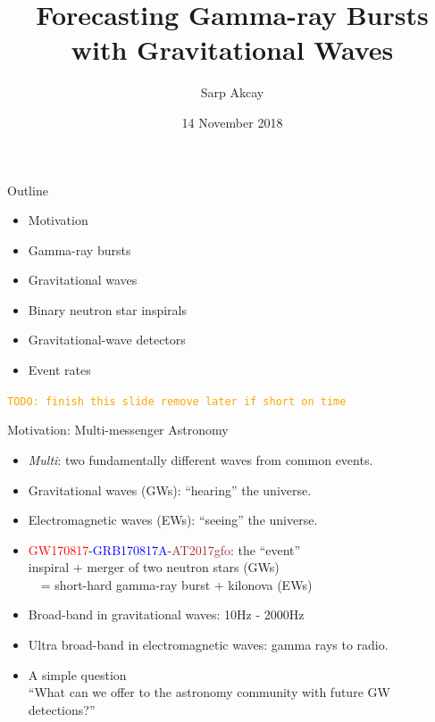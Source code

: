 \documentclass[xcolor=dvipsnames,handout,t]{beamer}
\title[] %
\title[Forecasting GRBs w/ GWs] %
{Forecasting Gamma-ray Bursts with Gravitational Waves}
\subtitle{\todo{Add background image}} %
\author[Sarp Akcay]{Sarp Akcay\inst{1}\inst{2} }
\institute[FSU Jena - UCD] %
{
  \inst{1}%
  FSU Jena %
  \inst{2}%
  University College Dublin
  }
\date[Sabanci University]{14 November 2018}
\newcommand{\todo}[1]{\textcolor{orange}{\texttt{TODO: #1}}}
\newcommand{\red}[1]{\textcolor{red}{#1}}
\newcommand{\bl}[1]{\textcolor{blue}{#1}}
\begin{document}
\begin{frame}
 \titlepage
\end{frame}

\begin{frame}{Outline}
\begin{itemize}
 \item Motivation
 \item Gamma-ray bursts
 \item Gravitational waves
 \item Binary neutron star inspirals
 \item Gravitational-wave detectors
 \item Event rates 
\end{itemize}
\todo{finish this slide remove later if short on time}

 
\end{frame}


\begin{frame}{Motivation: Multi-messenger Astronomy}
  \begin{itemize}
    \item \emph{Multi}: two fundamentally different waves from common events.
    \item[]\quad Gravitational waves (GWs): ``hearing''  the universe.
    \item[]\quad Electromagnetic waves (EWs): ``seeing'' the universe.
    \item \red{GW170817}-\bl{GRB170817A}-\textcolor{brown}{AT2017gfo}: the ``event'' \\
    \quad inspiral + merger of two neutron stars (GWs) \\
    \ \ = short-hard gamma-ray burst + kilonova (EWs)
    \item[] Broad-band in gravitational waves: 10Hz - 2000Hz
    \item[] Ultra broad-band in electromagnetic waves: gamma rays to radio.
    \item A simple question \\
    {\small ``What can we offer to the astronomy community with future GW detections?''}
  \end{itemize}
\end{frame}
\end{document}
